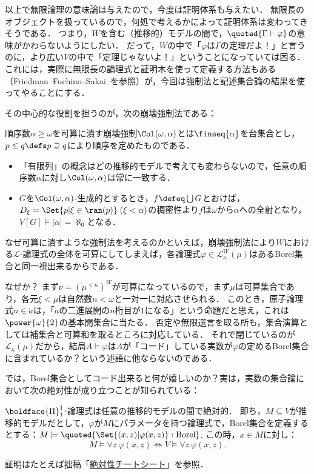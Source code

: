 \documentclass[a4j,leqno]{ltjsarticle}
\begin{document}
以上で無限論理の意味論は与えたので，今度は証明体系も与えたい．
無限長のオブジェクトを扱っているので，何処で考えるかによって証明体系は変わってきそうである．
つまり，$W$を含む（推移的）モデルの間で，$\quoted{\Gamma \vdash \varphi}$の意味がかわらないようにしたい．
だって，$W$の中で「$\varphi$は$\Gamma$の定理だよ！」と言うのに，より広い$V$の中で「定理じゃないよ！」ということになっていては困る．
これには，実際に無限長の論理式と証明木を使って定義する方法もある（Friedman--Fuchino--Sakai~\cite{Friedman:2016lr}を参照）が，今回は強制法と記述集合論の結果を使ってやることにする．

その中心的な役割を担うのが，次の崩壊強制法である：
\begin{definition}
 順序数$\alpha \geq \omega$を可算に潰す崩壊強制$\Col(\omega, \alpha)$とは$\finseq{\alpha}$を台集合とし，$p \leq q \defs p \supseteq q$により順序を定めたものである．
\end{definition}
\begin{remark}
 \begin{itemize}
  \item 「有限列」の概念はどの推移的モデルで考えても変わらないので，任意の順序数$\alpha$に対し$\Col(\omega, \alpha)$は常に一致する．
  \item $G$を$\Col(\omega, \alpha)$-生成的とするとき，$f \defeq \bigcup G$とおけば，$D_\xi = \Set{p | \xi \in \ran(p)}\;(\xi < \alpha)$の稠密性より$f$は$\omega$から$\alpha$への全射となり，$V[G] \models |\alpha| = \aleph_0$となる．
 \end{itemize}
\end{remark}
なぜ可算に潰すような強制法を考えるのかといえば，崩壊強制法により$W$における$\mathcal{L}$-論理式の全体を可算にしてしまえば，各論理式$\varphi \in \mathcal{L}_{\kappa}^W(\mu)$はあるBorel集合と同一視出来るからである．

なぜか？
まず$\nu = (\mu^{<\kappa})^{W}$が可算になっているので，まず$\mu$は可算集合であり，各元$\xi < \mu$は自然数$n < \omega$と一対一に対応させられる．
このとき，原子論理式$n \in \dot{a}$は，「$\dot{a}$の二進展開の$n$桁目が$1$になる」という命題だと思え，これは$\power{\omega}{2}$の基本開集合に当たる．
否定や無限選言を取る所も，集合演算としては補集合と可算和を取るところに対応している．
それで閉じているのが$\mathcal{L}_\kappa(\mu)$だから，結局$A \models \varphi$は$A$が「コード」している実数が$\varphi$の定めるBorel集合に含まれているか？という述語に他ならないのである．

では，Borel集合としてコード出来ると何が嬉しいのか？実は，実数の集合論において次の絶対性が成り立つことが知られている：
\begin{theorem}
 $\boldface{\Pi}^1_1$-論理式は任意の推移的モデルの間で絶対的．
 即ち，$M \subseteq V$が推移的モデルだとして，$\varphi$が$M$にパラメータを持つ論理式で，Borel集合を定義するとする：$M \models \quoted{\Set{(x, z) | \varphi(x, z)}: \text{Borel}}$.
 この時，$x \in M$に対し：
 \[
  M \models \forall z \: \varphi(x, z) \iff V \models \forall z \: \varphi(x, z).
 \]
\end{theorem}
証明はたとえば拙稿「\href{http://konn-san.com/math/absoluteness-cheatsheet.html}{絶対性チートシート}」\cite{Ishii:2016db}を参照．
\end{document}
